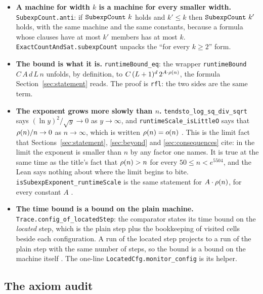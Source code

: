 \begin{itemize}
\item \textbf{A machine for width $k$ is a machine for every smaller
  width.} \texttt{SubexpCount.anti}: if \(\texttt{SubexpCount}\ k\) holds and
  $k' \le k$ then \(\texttt{SubexpCount}\ k'\) holds, with the same machine and
  the same constants, because a formula whose clauses have at most $k'$
  members has at most $k$. \texttt{ExactCountAndSat.subexpCount} unpacks
  the ``for every $k \ge 2$'' form.
\item \textbf{The bound is what it is.} \texttt{runtimeBound\_eq}: the
  wrapper \texttt{runtimeBound} $C\,A\,d\,L\,n$ unfolds, by definition,
  to $C\,(L+1)^d\,2^{A\cdot\rho(n)}$, the formula
  Section~\ref{sec:statement} reads. The proof is \texttt{rfl}: the two
  sides are the same term.
\item \textbf{The exponent grows more slowly than $n$.}
  \texttt{tendsto\_log\_sq\_div\_sqrt} says $(\ln y)^2/\sqrt{y} \to 0$
  as $y \to \infty$, and \texttt{runtimeScale\_isLittleO} says that
  $\rho(n)/n \to 0$ as $n \to \infty$, which is written $\rho(n) = o(n)$
  . This is the limit fact that
  Sections~\ref{sec:statement}, \ref{sec:beyond} and
  \ref{sec:consequences} cite: in the limit the exponent is smaller than
  $n$ by any factor one names. It is true at the same time as the
  title's fact that $\rho(n) > n$ for every $50 \le n < e^{5504}$, and the
  Lean says nothing about where the limit begins to bite.
  \texttt{isSubexpExponent\_runtimeScale} is the same statement for
  $A \cdot \rho(n)$, for every constant $A$ .
\item \textbf{The time bound is a bound on the plain machine.}
  \texttt{Trace.config\_of\_locatedStep}: the comparator states its time bound on the \emph{located} step, which is the plain step plus the bookkeeping of visited cells beside each configuration. A run of the located step projects to a run of the
  plain step with the same number of steps, so the bound is a bound on
  the machine itself . The one-line
  \texttt{LocatedCfg.monitor\_config} is its helper.
\end{itemize}

\subsection{The axiom audit}
\label{sec:lean-audit}

